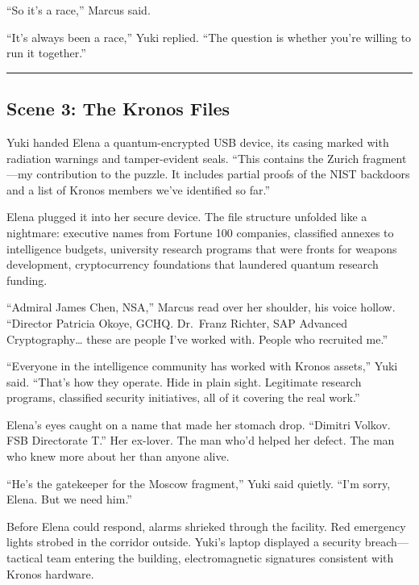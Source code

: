 ``So it's a race,'' Marcus said.

``It's always been a race,'' Yuki replied. ``The question is whether you're willing to run it together.''

\begin{center}\rule{0.5\linewidth}{0.5pt}\end{center}

\hypertarget{scene-3-the-kronos-files}{%
\subsection{Scene 3: The Kronos Files}\label{scene-3-the-kronos-files}}

Yuki handed Elena a quantum-encrypted USB device, its casing marked with radiation warnings and tamper-evident seals. ``This contains the Zurich fragment---my contribution to the puzzle. It includes partial proofs of the NIST backdoors and a list of Kronos members we've identified so far.''

Elena plugged it into her secure device. The file structure unfolded like a nightmare: executive names from Fortune 100 companies, classified annexes to intelligence budgets, university research programs that were fronts for weapons development, cryptocurrency foundations that laundered quantum research funding.

``Admiral James Chen, NSA,'' Marcus read over her shoulder, his voice hollow. ``Director Patricia Okoye, GCHQ. Dr.~Franz Richter, SAP Advanced Cryptography\ldots{} these are people I've worked with. People who recruited me.''

``Everyone in the intelligence community has worked with Kronos assets,'' Yuki said. ``That's how they operate. Hide in plain sight. Legitimate research programs, classified security initiatives, all of it covering the real work.''

Elena's eyes caught on a name that made her stomach drop. ``Dimitri Volkov. FSB Directorate T.'' Her ex-lover. The man who'd helped her defect. The man who knew more about her than anyone alive.

``He's the gatekeeper for the Moscow fragment,'' Yuki said quietly. ``I'm sorry, Elena. But we need him.''

Before Elena could respond, alarms shrieked through the facility. Red emergency lights strobed in the corridor outside. Yuki's laptop displayed a security breach---tactical team entering the building, electromagnetic signatures consistent with Kronos hardware.

